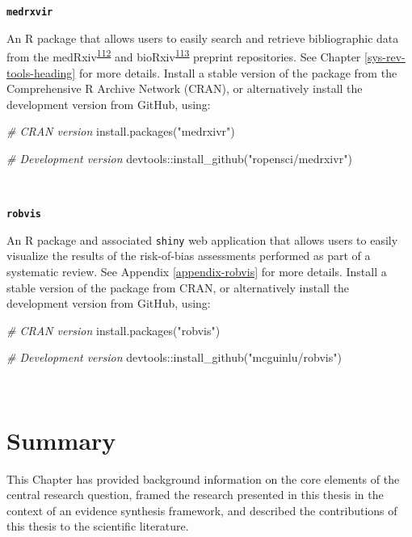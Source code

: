 \documentclass[a4paper, twoside]{templates/ociamthesis}
\newenvironment{Shaded}{\begin{snugshade}}{\end{snugshade}}
\newcommand{\CommentTok}[1]{\textcolor[rgb]{0.56,0.35,0.01}{\textit{#1}}}
\newcommand{\FunctionTok}[1]{\textcolor[rgb]{0.00,0.00,0.00}{#1}}
\newcommand{\NormalTok}[1]{#1}
\newcommand{\SpecialCharTok}[1]{\textcolor[rgb]{0.00,0.00,0.00}{#1}}
\newcommand{\StringTok}[1]{\textcolor[rgb]{0.31,0.60,0.02}{#1}}
\renewenvironment{Shaded}
{
  \vspace{4pt}%
  \begin{snugshade}%
}{%
  \end{snugshade}%
  \vspace{4pt}%
}
\begin{document}
\textbf{\texttt{medrxvir}}

An R package that allows users to easily search and retrieve bibliographic data from the medRxiv\textsuperscript{\protect\hyperlink{ref-rawlinson2019}{112}} and bioRxiv\textsuperscript{\protect\hyperlink{ref-sever2019}{113}} preprint repositories. See Chapter \ref{sys-rev-tools-heading} for more details. Install a stable version of the package from the Comprehensive R Archive Network (CRAN), or alternatively install the development version from GitHub, using:

\begin{Shaded}
\begin{Highlighting}[]
\CommentTok{\# CRAN version}
\FunctionTok{install.packages}\NormalTok{(}\StringTok{"medrxivr"}\NormalTok{)}

\CommentTok{\# Development version}
\NormalTok{devtools}\SpecialCharTok{::}\FunctionTok{install\_github}\NormalTok{(}\StringTok{"ropensci/medrxivr"}\NormalTok{)}
\end{Highlighting}
\end{Shaded}

~

\textbf{\texttt{robvis}}

An R package and associated \texttt{shiny} web application that allows users to easily visualize the results of the risk-of-bias assessments performed as part of a systematic review. See Appendix \ref{appendix-robvis} for more details. Install a stable version of the package from CRAN, or alternatively install the development version from GitHub, using:

\begin{Shaded}
\begin{Highlighting}[]
\CommentTok{\# CRAN version}
\FunctionTok{install.packages}\NormalTok{(}\StringTok{"robvis"}\NormalTok{)}

\CommentTok{\# Development version}
\NormalTok{devtools}\SpecialCharTok{::}\FunctionTok{install\_github}\NormalTok{(}\StringTok{"mcguinlu/robvis"}\NormalTok{)}
\end{Highlighting}
\end{Shaded}

~

\hypertarget{summary}{%
\section{Summary}\label{summary}}

This Chapter has provided background information on the core elements of the central research question, framed the research presented in this thesis in the context of an evidence synthesis framework, and described the contributions of this thesis to the scientific literature.
\end{document}
